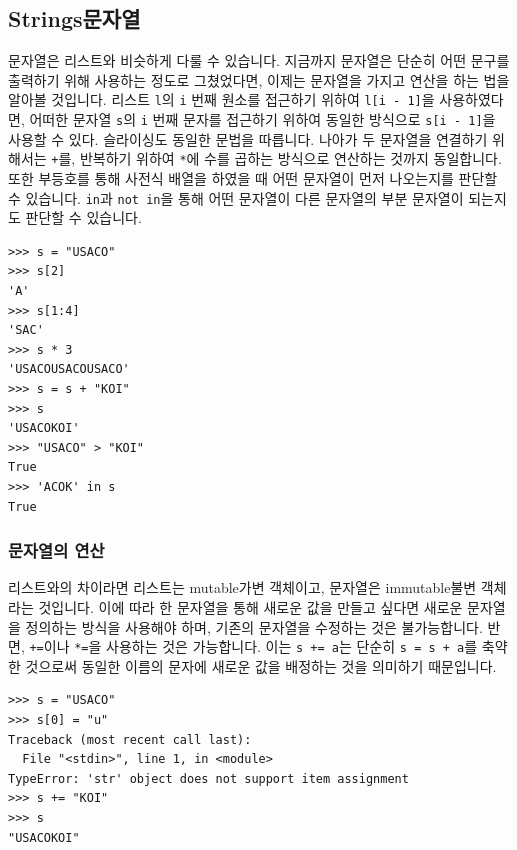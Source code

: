 \documentclass[../main.tex]{subfiles}
\begin{document}
\subsection{Strings문자열}
문자열은 리스트와 비슷하게 다룰 수 있습니다.
지금까지 문자열은 단순히 어떤 문구를 출력하기 위해 사용하는 정도로 그쳤었다면, 이제는 문자열을 가지고 연산을 하는 법을 알아볼 것입니다.
리스트 \texttt{l}의 \texttt{i} 번째 원소를 접근하기 위하여 \texttt{l[i - 1]}을 사용하였다면, 어떠한 문자열 \texttt{s}의 \texttt{i} 번째 문자를 접근하기 위하여 동일한 방식으로 \texttt{s[i - 1]}을 사용할 수 있다.
슬라이싱도 동일한 문법을 따릅니다.
나아가 두 문자열을 연결하기 위해서는 \texttt{+}를, 반복하기 위하여 \texttt{*}에 수를 곱하는 방식으로 연산하는 것까지 동일합니다.
또한 부등호를 통해 사전식 배열을 하였을 때 어떤 문자열이 먼저 나오는지를 판단할 수 있습니다.
\texttt{in}과 \texttt{not in}을 통해 어떤 문자열이 다른 문자열의 부분 문자열이 되는지도 판단할 수 있습니다.
\begin{verbatim}
>>> s = "USACO"
>>> s[2]
'A'
>>> s[1:4]
'SAC'
>>> s * 3
'USACOUSACOUSACO'
>>> s = s + "KOI"
>>> s
'USACOKOI'
>>> "USACO" > "KOI"
True
>>> 'ACOK' in s
True
\end{verbatim}

\subsubsection{문자열의 연산}
리스트와의 차이라면 리스트는 mutable가변 객체이고, 문자열은 immutable불변 객체라는 것입니다.
이에 따라 한 문자열을 통해 새로운 값을 만들고 싶다면 새로운 문자열을 정의하는 방식을 사용해야 하며, 기존의 문자열을 수정하는 것은 불가능합니다.
반면, \texttt{+=}이나 \texttt{*=}을 사용하는 것은 가능합니다.
이는 \texttt{s += \textquotesingle a\textquotesingle}는 단순히 \texttt{s = s + \textquotesingle a\textquotesingle}를 축약한 것으로써 동일한 이름의 문자에 새로운 값을 배정하는 것을 의미하기 때문입니다.
\begin{verbatim}
>>> s = "USACO"
>>> s[0] = "u"
Traceback (most recent call last):
  File "<stdin>", line 1, in <module>
TypeError: 'str' object does not support item assignment
>>> s += "KOI"
>>> s
"USACOKOI"
\end{verbatim}
\end{document}
